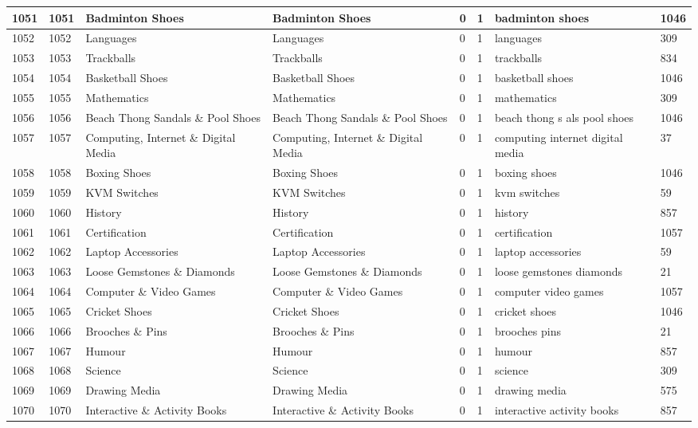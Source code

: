 \begin{longtable}{|l|l|l|l|l|l|l|l|}
1051 & 1051 & Badminton Shoes & Badminton Shoes & 0 & 1 & badminton shoes & 1046 \\ \hline 
1052 & 1052 & Languages & Languages & 0 & 1 & languages & 309 \\ \hline 
1053 & 1053 & Trackballs & Trackballs & 0 & 1 & trackballs & 834 \\ \hline 
1054 & 1054 & Basketball Shoes & Basketball Shoes & 0 & 1 & basketball shoes & 1046 \\ \hline 
1055 & 1055 & Mathematics & Mathematics & 0 & 1 & mathematics & 309 \\ \hline 
1056 & 1056 & Beach Thong Sandals \& Pool Shoes & Beach Thong Sandals \& Pool Shoes & 0 & 1 & beach thong s als pool shoes & 1046 \\ \hline 
1057 & 1057 & Computing, Internet \& Digital Media & Computing, Internet \& Digital Media & 0 & 1 & computing internet digital media & 37 \\ \hline 
1058 & 1058 & Boxing Shoes & Boxing Shoes & 0 & 1 & boxing shoes & 1046 \\ \hline 
1059 & 1059 & KVM Switches & KVM Switches & 0 & 1 & kvm switches & 59 \\ \hline 
1060 & 1060 & History & History & 0 & 1 & history & 857 \\ \hline 
1061 & 1061 & Certification & Certification & 0 & 1 & certification & 1057 \\ \hline 
1062 & 1062 & Laptop Accessories & Laptop Accessories & 0 & 1 & laptop accessories & 59 \\ \hline 
1063 & 1063 & Loose Gemstones \& Diamonds & Loose Gemstones \& Diamonds & 0 & 1 & loose gemstones diamonds & 21 \\ \hline 
1064 & 1064 & Computer \& Video Games & Computer \& Video Games & 0 & 1 & computer video games & 1057 \\ \hline 
1065 & 1065 & Cricket Shoes & Cricket Shoes & 0 & 1 & cricket shoes & 1046 \\ \hline 
1066 & 1066 & Brooches \& Pins & Brooches \& Pins & 0 & 1 & brooches pins & 21 \\ \hline 
1067 & 1067 & Humour & Humour & 0 & 1 & humour & 857 \\ \hline 
1068 & 1068 & Science & Science & 0 & 1 & science & 309 \\ \hline 
1069 & 1069 & Drawing Media & Drawing Media & 0 & 1 & drawing media & 575 \\ \hline 
1070 & 1070 & Interactive \& Activity Books & Interactive \& Activity Books & 0 & 1 & interactive activity books & 857 \\ \hline 

\end{longtable}
